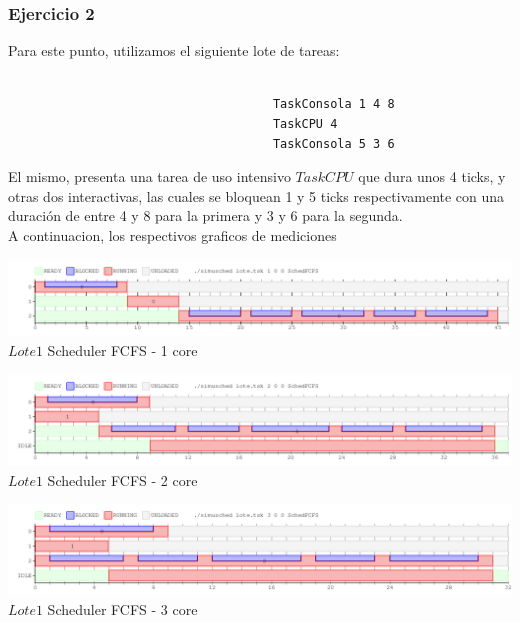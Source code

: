 \subsubsection[Resolución Ejercicio 2]{Ejercicio 2}

\indent Para este punto, utilizamos el siguiente lote de tareas:
\begin{verbatim}
 
                                     TaskConsola 1 4 8
                                     TaskCPU 4
                                     TaskConsola 5 3 6

\end{verbatim}

\indent El mismo, presenta una tarea de uso intensivo $TaskCPU$ que dura unos 4 ticks, y otras dos interactivas, las cuales se
bloquean 1 y 5 ticks respectivamente con una duración de entre 4 y 8 para la primera y 3 y 6 para la segunda.\\
A continuacion, los respectivos graficos de mediciones


\vspace*{0.3cm} \vspace*{0.3cm}
  \begin{center}
 \includegraphics[scale=0.5]{ejercicio2-1nucleo.png}
 { $Lote 1$ Scheduler FCFS - 1 core }
 \end{center}
  \vspace*{0.3cm}


\vspace*{0.3cm} \vspace*{0.3cm}
  \begin{center}
 \includegraphics[scale=0.5]{ejercicio2-2nucleo.png}
 { $Lote 1$ Scheduler FCFS - 2 core }
 \end{center}
  \vspace*{0.3cm}

\vspace*{0.3cm} \vspace*{0.3cm}
  \begin{center}
 \includegraphics[scale=0.5]{ejercicio2-3nucleo.png}
  {$Lote 1$ Scheduler FCFS - 3 core }
 \end{center}
  \vspace*{0.3cm}

